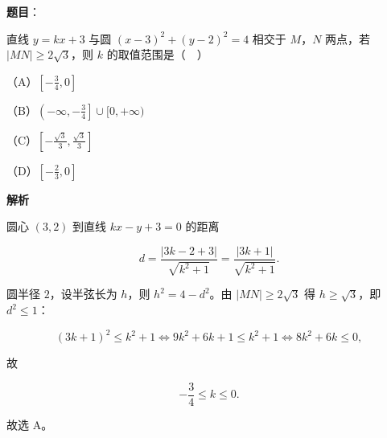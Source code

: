 \begin{answer}

\textbf{题目}：

直线 $y=kx+3$ 与圆 $(x-3)^2+(y-2)^2=4$ 相交于 $M$，$N$ 两点，若 $|MN|\geqslant2\sqrt3$，则 $k$ 的取值范围是（　）

（A）$\left[-\frac34,0\right]$

（B）$\left(-\infty,-\frac34\right]\cup[0,+\infty)$

（C）$\left[-\frac{\sqrt3}3,\frac{\sqrt3}3\right]$

（D）$\left[-\frac23,0\right]$

\textbf{解析}

圆心 $(3,2)$ 到直线 $kx-y+3=0$ 的距离

\nopagebreak[4]
\[d=\frac{|3k-2+3|}{\sqrt{k^2+1}}=\frac{|3k+1|}{\sqrt{k^2+1}}.\]

圆半径 $2$，设半弦长为 $h$，则 $h^2=4-d^2$。由 $|MN|\geqslant2\sqrt3$ 得 $h\geqslant\sqrt3$，即 $d^2\leqslant1$：

\nopagebreak[4]
\[(3k+1)^2\leqslant k^2+1
\iff 9k^2+6k+1\leqslant k^2+1
\iff 8k^2+6k\leqslant0,\]

故

\nopagebreak[4]
\[-\frac34\leqslant k\leqslant0.\]

故选 A。


\end{answer}
